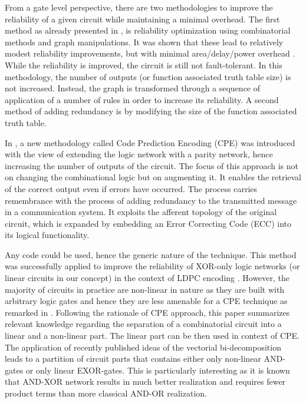 \documentclass[12pt]{toptesi}
\begin{document}
From a gate level perspective, there are two methodologies to improve the reliability of a given circuit while maintaining a minimal overhead. The first method as already presented in \cite{Grandhi15}, is reliability optimization using combinatorial methods and graph manipulations. It was shown that these lead to relatively modest reliability improvements, but with minimal area/delay/power overhead \cite{Grandhi15}. 
While the reliability is improved, the circuit is still not fault-tolerant. In this methodology, the number of outputs (or function associated truth table size) is not increased. Instead, the graph is transformed through a sequence of application of a number of rules in order to increase its reliability. A second method of adding redundancy is by modifying the size of the function associated truth table. 

In \cite{D5.2, ETS}, a new methodology called Code Prediction Encoding (CPE) was introduced with the view of extending the logic network with a parity network, hence increasing the number of outputs of the circuit. The focus of this approach is not on changing the combinational logic but on augmenting it. It enables the retrieval of the correct output even if errors have occurred. The process carries remembrance with the process of adding redundancy to the transmitted message in a communication system. It exploits the afferent topology of the original circuit, which is expanded by embedding an Error Correcting Code (ECC) into its logical functionality. 

Any code could be used, hence the generic nature of the technique. This method was successfully applied to improve the reliability of XOR-only logic networks (or linear circuits in our concept) in the context of LDPC encoding 
\cite{ICC}. 
However, the majority of circuits in practice are non-linear in nature as they are built with arbitrary logic gates and hence they are less amenable for a CPE technique as remarked in \cite{D5.2}. 
Following the rationale of CPE approach, this paper summarizes relevant knowledge regarding the separation of a combinatorial circuit into a linear and a non-linear part. The linear part can be then used in context of CPE. The application of recently published ideas of the vectorial bi-decomposition \cite{S_VBD_LF_RM_2015} leads to a partition of circuit parts that contains either only non-linear AND-gates or only linear EXOR-gates. This is particularly interesting as it is known that AND-XOR network results in much better realization and requires fewer product terms than more classical AND-OR realization. 
 
\end{document}
